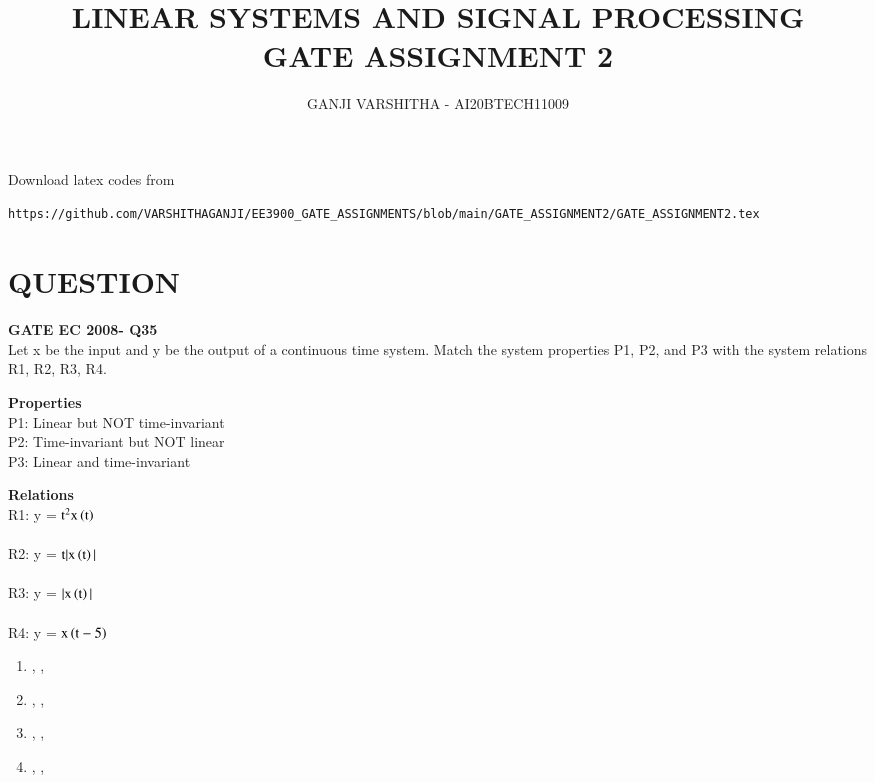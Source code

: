 \documentclass[journal,12pt,twocolumn]{IEEEtran}
\begin{document}
\let\vec\mathbf
\renewcommand{\thefigure}{\theproblem}
\def\putbox#1#2#3{\makebox[0in][l]{\makebox[#1][l]{}\raisebox{\baselineskip}[0in][0in]{\raisebox{#2}[0in][0in]{#3}}}}
     \def\rightbox#1{\makebox[0in][r]{#1}}
     \def\centbox#1{\makebox[0in]{#1}}
     \def\topbox#1{\raisebox{-\baselineskip}[0in][0in]{#1}}
     \def\midbox#1{\raisebox{-0.5\baselineskip}[0in][0in]{#1}}
\vspace{3cm}
\title{\textbf{LINEAR SYSTEMS AND SIGNAL PROCESSING \\ GATE ASSIGNMENT 2}}
\author{GANJI VARSHITHA - AI20BTECH11009}
\maketitle
\newpage
\bigskip
\renewcommand{\thefigure}{\arabic{figure}}
\renewcommand{\thetable}{\arabic{table}}
Download latex codes from 
%
\begin{lstlisting}
https://github.com/VARSHITHAGANJI/EE3900_GATE_ASSIGNMENTS/blob/main/GATE_ASSIGNMENT2/GATE_ASSIGNMENT2.tex
\end{lstlisting}

\section*{QUESTION}
\textbf{GATE EC 2008- Q35}\\
Let x be the input and y be the output of a continuous time system. Match the system properties P1, P2, and P3 with the system relations R1, R2, R3, R4.
\begin{multicols}{2}


\textbf{Properties}\\
P1: Linear but NOT time-invariant\\
P2: Time-invariant but NOT linear\\
P3: Linear and time-invariant
\columnbreak

\textbf{Relations}\\
R1: y = $\text{t}^2\text{x}\left(\text{t}\right)$ \\
\\
R2: y = $\text{t}| \text{x}\left(\text{t}\right)|$ \\
\\
R3: y = $| \text{x}\left(\text{t}\right)|$ \\
\\
R4: y = $\text{x}\left(\text{t}-5\right)$ \\


\end{multicols}
\begin{enumerate}
\item {}, , 
\item {}, , 
\item {}, , 
\item {}, , 
\end{enumerate}
\end{document}
